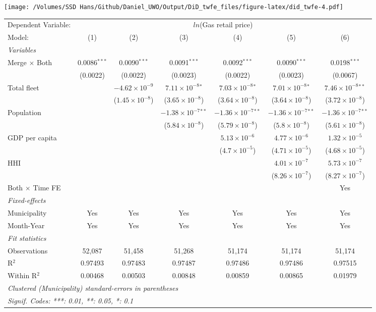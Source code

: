 \documentclass[
]{article}
\begin{document}
\texttt{[image: /Volumes/SSD Hans/Github/Daniel\_UWO/Output/DiD\_twfe\_files/figure-latex/did\_twfe-4.pdf]}

\begin{tabular}{lcccccc}
\tabularnewline\midrule\midrule
Dependent Variable:&\multicolumn{6}{c}{$ln$(Gas retail price)}\\
Model:&(1) & (2) & (3) & (4) & (5) & (6)\\
\midrule \emph{Variables}&   &   &   &   &   &  \\
Merge $\times $ Both & 0.0086$^{***}$ & 0.0090$^{***}$ & 0.0091$^{***}$ & 0.0092$^{***}$ & 0.0090$^{***}$ & 0.0198$^{***}$\\
  &(0.0022) & (0.0022) & (0.0023) & (0.0022) & (0.0023) & (0.0067)\\
Total fleet &    & $-4.62\times 10^{-9}$ & $7.11\times 10^{-8}$$^{*}$ & $7.03\times 10^{-8}$$^{*}$ & $7.01\times 10^{-8}$$^{*}$ & $7.46\times 10^{-8}$$^{**}$\\
  &   & ($1.45\times 10^{-8}$) & ($3.65\times 10^{-8}$) & ($3.64\times 10^{-8}$) & ($3.64\times 10^{-8}$) & ($3.72\times 10^{-8}$)\\
Population &    &    & $-1.38\times 10^{-7}$$^{**}$ & $-1.36\times 10^{-7}$$^{**}$ & $-1.36\times 10^{-7}$$^{**}$ & $-1.36\times 10^{-7}$$^{**}$\\
  &   &    & ($5.84\times 10^{-8}$) & ($5.79\times 10^{-8}$) & ($5.8\times 10^{-8}$) & ($5.61\times 10^{-8}$)\\
GDP per capita &    &    &    & $5.13\times 10^{-6}$ & $4.77\times 10^{-6}$ & $1.32\times 10^{-5}$\\
  &   &    &    & ($4.7\times 10^{-5}$) & ($4.71\times 10^{-5}$) & ($4.68\times 10^{-5}$)\\
HHI &    &    &    &    & $4.01\times 10^{-7}$ & $5.73\times 10^{-7}$\\
  &   &    &    &    & ($8.26\times 10^{-7}$) & ($8.27\times 10^{-7}$)\\
Both $\times$ Time FE &  &  &  &  &  & Yes\\
\midrule \emph{Fixed-effects}&   &   &   &   &   &  \\
Municipality & Yes & Yes & Yes & Yes & Yes & Yes\\
Month-Year & Yes & Yes & Yes & Yes & Yes & Yes\\
\midrule \emph{Fit statistics}&  & & & & & \\
Observations & 52,087&51,458&51,268&51,174&51,174&51,174\\
R$^2$ & 0.97493&0.97483&0.97487&0.97486&0.97486&0.97515\\
Within R$^2$ & 0.00468&0.00503&0.00848&0.00859&0.00865&0.01979\\
\midrule\midrule\multicolumn{7}{l}{\emph{Clustered (Municipality) standard-errors in parentheses}}\\
\multicolumn{7}{l}{\emph{Signif. Codes: ***: 0.01, **: 0.05, *: 0.1}}\\
\end{tabular}
\end{document}
